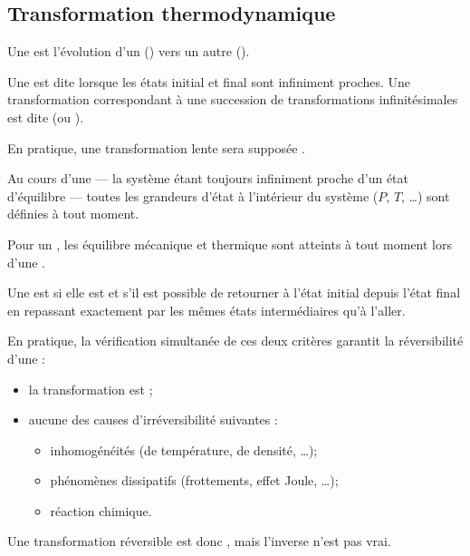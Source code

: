 \subsection{Transformation thermodynamique}

\begin{definition}
Une  est l'évolution d'un  () vers un autre ().
\end{definition}

\begin{definition}
Une  est dite  lorsque les états initial et final sont infiniment proches. Une transformation correspondant à une succession de transformations infinitésimales est dite  (ou ).
\end{definition}

\begin{remarque}
En pratique, une transformation lente sera supposée .
\end{remarque}

\begin{propriete}
Au cours d'une  --- la système étant toujours infiniment proche d'un état d'équilibre --- toutes les grandeurs d'état à l'intérieur du système ($P$, $T$, \ldots) sont définies à tout moment.
\end{propriete}

\begin{remarque}
Pour un , les équilibre mécanique et thermique sont atteints à tout moment lors d'une .
\end{remarque}

\begin{definition}
Une  est  si elle est  et s'il est possible de retourner à l'état initial depuis l'état final en repassant exactement par les mêmes états intermédiaires qu'à l'aller.
\end{definition}

\begin{remarque}
En pratique, la vérification simultanée de ces deux critères garantit la réversibilité d'une  :

\begin{itemize}
\item la transformation est ;
\item aucune des causes d'irréversibilité suivantes :
\begin{itemize}
\item inhomogénéités (de température, de densité, \ldots);
\item phénomènes dissipatifs (frottements, effet Joule, \ldots);
\item réaction chimique.
\end{itemize}
\end{itemize}

\noindent Une transformation réversible est donc , mais l'inverse n'est pas vrai.
\end{remarque}

